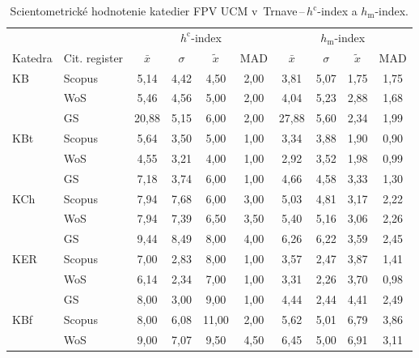\begin{table}
  \centering\small
  \caption[Hodnotenie FPV\,--\,$h^{\mathrm{c}}$-index a $h_{\mathrm{m}}$-index]{Scientometrické hodnotenie katedier FPV UCM v~Trnave\,--\,$h^{\mathrm{c}}$-index a $h_{\mathrm{m}}$-index.}
  \label{tab:6-staff.results}
  \begin{tabularx}{\textwidth}{XXcccc@{\hspace{3ex}}cccc}
    \toprule\noalign{\vspace{.3ex}}
    & & \multicolumn{4}{c}{$h^{\mathrm{c}}$-index} & \multicolumn{4}{c}{$h_{\mathrm{m}}$-index} \\
    \cmidrule{3-6}\cmidrule{7-10}
    Katedra & Cit. register& $\bar{x}$ & $\sigma$ & $\tilde{x}$ & MAD  & $\bar{x}$ & $\sigma$ & $\tilde{x}$ & MAD \\[0.3ex]
    \midrule\noalign{\vspace{.5ex}}
    KB   & Scopus & 5,14  & 4,42 & 4,50  & 2,00 & 3,81  & 5,07 & 1,75 & 1,75 \\
         & WoS    & 5,46  & 4,56 & 5,00  & 2,00 & 4,04  & 5,23 & 2,88 & 1,68 \\
         & GS     & 20,88 & 5,15 & 6,00  & 2,00 & 27,88 & 5,60 & 2,34 & 1,99 \\[3ex]
    KBt  & Scopus & 5,64  & 3,50 & 5,00  & 1,00 & 3,34  & 3,88 & 1,90 & 0,90 \\
         & WoS    & 4,55  & 3,21 & 4,00  & 1,00 & 2,92  & 3,52 & 1,98 & 0,99 \\
         & GS     & 7,18  & 3,74 & 6,00  & 1,00 & 4,66  & 4,58 & 3,33 & 1,30 \\[3ex]
    KCh  & Scopus & 7,94  & 7,68 & 6,00  & 3,00 & 5,03  & 4,81 & 3,17 & 2,22 \\
         & WoS    & 7,94  & 7,39 & 6,50  & 3,50 & 5,40  & 5,16 & 3,06 & 2,26 \\
         & GS     & 9,44  & 8,49 & 8,00  & 4,00 & 6,26  & 6,22 & 3,59 & 2,45 \\[3ex]
    KER  & Scopus & 7,00  & 2,83 & 8,00  & 1,00 & 3,57  & 2,47 & 3,87 & 1,41 \\
         & WoS    & 6,14  & 2,34 & 7,00  & 1,00 & 3,31  & 2,26 & 3,70 & 0,98 \\
         & GS     & 8,00  & 3,00 & 9,00  & 1,00 & 4,44  & 2,44 & 4,41 & 2,49 \\[3ex]
    KBf  & Scopus & 8,00  & 6,08 & 11,00 & 2,00 & 5,62  & 5,01 & 6,79 & 3,86 \\
         & WoS    & 9,00  & 7,07 & 9,50  & 4,50 & 6,45  & 5,00 & 6,91 & 3,11 \\

\end{tabularx}
\end{table}
